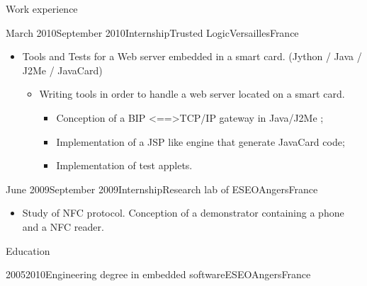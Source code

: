 \documentclass[a4paper, 10pt]{article}
\begin{document}
\begin{section} {Work experience}
    \begin{unbreakableExperience}{March 2010}{September 2010}{Internship}{Trusted Logic}{Versailles}{France}
	\begin{subexperience}
	    \begin{itemize}[parsep=0cm,itemsep=0cm,topsep=0cm]
		\item Tools and Tests for a Web server embedded in a smart card. (Jython / Java / J2Me / JavaCard)
		    \begin{itemize}[parsep=0cm,itemsep=0cm,topsep=0cm]
			\item Writing tools in order to handle a web server located on a smart card.
			    \begin{itemize}[parsep=0cm,itemsep=0cm,topsep=0cm]
				\item Conception of a BIP \textless==\textgreater TCP/IP gateway in Java/J2Me ;
				\item Implementation of a JSP like engine that generate JavaCard code;
				\item Implementation of test applets.
			    \end{itemize}
		    \end{itemize}
	    \end{itemize}
	\end{subexperience}
    \end{unbreakableExperience}

    \begin{unbreakableExperience}{June 2009}{September 2009}{Internship}{Research lab of ESEO}{Angers}{France}
	\begin{subexperience}
	    \begin{itemize}[parsep=0cm,itemsep=0cm,topsep=0cm]
		\item Study of NFC protocol. Conception of a demonstrator containing a phone and a NFC reader.
	    \end{itemize}
	\end{subexperience}
    \end{unbreakableExperience}
\end{section}

\begin{unbreakableSection} {Education}
    \begin{education}{2005}{2010}{Engineering degree in embedded software}{ESEO}{Angers}{France}
    \end{education}
\end{unbreakableSection}
\end{document}
